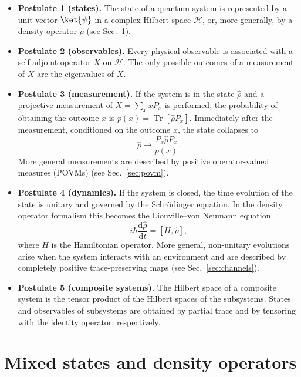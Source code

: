 \begin{itemize}
	\item \textbf{Postulate 1 (states).}
	The state of a quantum system is represented by a unit vector $\ket{\psi}$ in a complex Hilbert space $\mathcal{H}$, or, more generally, by a density operator $\hat{\rho}$ (see Sec.~\ref{sec:density_mixed}).
	
	\item \textbf{Postulate 2 (observables).}
	Every physical observable is associated with a self-adjoint operator $X$ on $\mathcal{H}$. 
	The only possible outcomes of a measurement of $X$ are the eigenvalues of $X$.
	
	\item \textbf{Postulate 3 (measurement).}
	If the system is in the state $\hat{\rho}$ and a projective measurement of $X = \sum_x x P_x$ is performed, the probability of obtaining the outcome $x$ is $p(x) = \operatorname{Tr}[\hat{\rho} P_x]$. 
	Immediately after the measurement, conditioned on the outcome $x$, the state collapses to
	\begin{equation}
		\hat{\rho} \longrightarrow \frac{P_x \hat{\rho} P_x}{p(x)}.
	\end{equation}
	More general measurements are described by positive operator-valued measures (POVMs) (see Sec.~\ref{sec:povm}).
	
	\item \textbf{Postulate 4 (dynamics).}
	If the system is closed, the time evolution of the state is unitary and governed by the Schrödinger equation. 
	In the density operator formalism this becomes the Liouville--von Neumann equation
	\begin{equation}
		i \hbar \frac{\mathrm{d}\hat{\rho}}{\mathrm{d}t} = [H,\hat{\rho}],
	\end{equation}
	where $H$ is the Hamiltonian operator. 
	More general, non-unitary evolutions arise when the system interacts with an environment and are described by completely positive trace-preserving maps (see Sec.~\ref{sec:channels}).
	
	\item \textbf{Postulate 5 (composite systems).}
	The Hilbert space of a composite system is the tensor product of the Hilbert spaces of the subsystems. 
	States and observables of subsystems are obtained by partial trace and by tensoring with the identity operator, respectively.
\end{itemize}

\section{Mixed states and density operators}
\label{sec:density_mixed}

